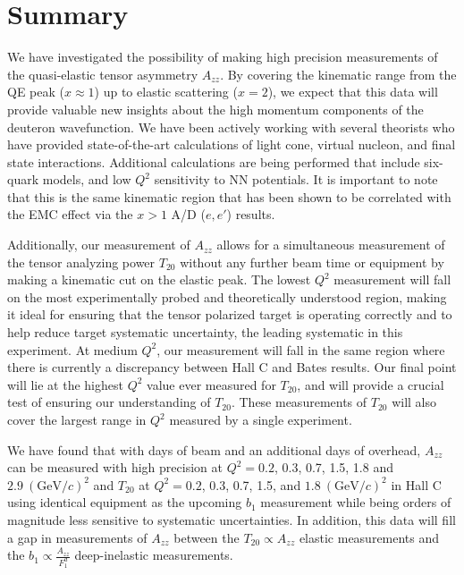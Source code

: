 \section{Summary}


We have investigated the possibility of making high precision measurements of the quasi-elastic tensor asymmetry $A_{zz}$.  By covering the kinematic range from the QE peak ($x\approx 1$) up to elastic scattering ($x=2$), we expect that this data will provide valuable new insights about the high momentum components of the deuteron wavefunction. We have been actively working with several theorists who have provided state-of-the-art calculations of light cone, virtual nucleon, and final state interactions. Additional calculations are being performed that include six-quark models, and low $Q^2$ sensitivity to NN potentials.  It is important to note that this is the same kinematic region that has been shown to be correlated with the EMC effect via the $x>1$ A/D ($e,e'$) results. 

Additionally, our measurement of $A_{zz}$ allows for a simultaneous measurement of the tensor analyzing power $T_{20}$ without any further beam time or equipment by making a kinematic cut on the elastic peak. The lowest $Q^2$ measurement will fall on the most experimentally probed and theoretically understood region, making it ideal for ensuring that the tensor polarized target is operating correctly and to help reduce target systematic uncertainty, the leading systematic in this experiment. At medium $Q^2$, our measurement will fall in the same region where there is currently a discrepancy between Hall C and Bates results. Our final point will lie at the highest $Q^2$ value ever measured for $T_{20}$, and will provide a crucial test of ensuring our understanding of $T_{20}$. These measurements of $T_{20}$ will also cover the largest range in $Q^2$ measured by a single experiment.


We have found that with \productiondays days of beam and an additional \overheaddays days of overhead, $A_{zz}$ can be measured with high precision at $Q^2=0.2$, 0.3, 0.7, 1.5, 1.8 and $2.9~(\mathrm{GeV}/c)^2$ and $T_{20}$ at $Q^2=0.2$, 0.3, 0.7, 1.5, and $1.8~(\mathrm{GeV}/c)^2$ in Hall C using identical equipment as the upcoming $b_1$ measurement while being orders of magnitude less sensitive to systematic uncertainties. In addition, this data will fill a gap in measurements of $A_{zz}$ between the $T_{20}\propto A_{zz}$ elastic measurements and the $b_1\propto \frac{A_{zz}}{F_1^d}$ deep-inelastic measurements. 


